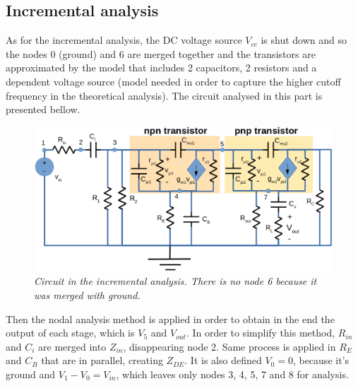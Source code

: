 \subsection{Incremental analysis}
As for the incremental analysis, the DC voltage source $V_{cc}$ is shut down and so the nodes 0 (ground) and 6 are merged together and the transistors are approximated by the model that includes 2 capacitors, 2 resistors and a dependent voltage source (model needed in order to capture the higher cutoff frequency in the theoretical analysis). The circuit analysed in this part is presented bellow.

\begin{figure}[H]
    \centering
    \includegraphics[width = 0.85\linewidth]{ac_analisys_circuit.png}
            \caption{\textit{Circuit in the incremental analysis. There is no node 6 because it was merged with ground.}}
    \label{fig:incrementalscheme}
\end{figure}

Then the nodal analysis method is applied in order to obtain in the end the output of each stage, which is $V_5$ and $V_{out}$. In order to simplify this method, $R_{in}$ and $C_i$ are merged into $Z_{in}$, disappearing node 2. Same process is applied in $R_E$ and $C_B$ that are in parallel, creating $Z_{DE}$. It is also defined $V_{0}=0$, because it's ground and $V_{1}-V_{0}=V_{in}$, which leaves only nodes 3, 4, 5, 7 and 8 for analysis.


